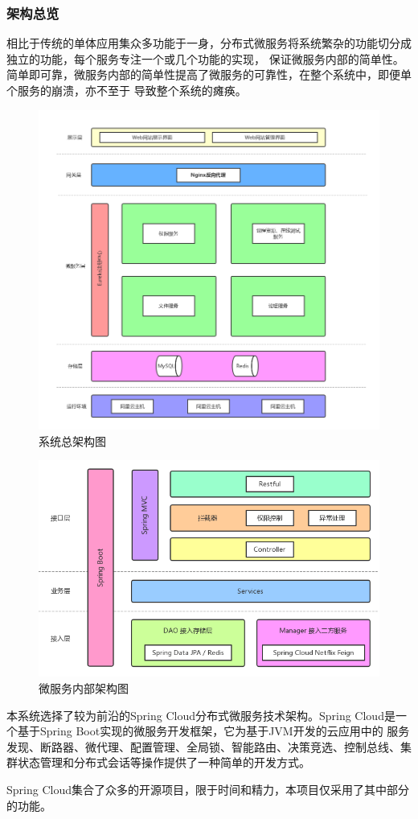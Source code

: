 \documentclass[titlepage,UTF8,linespread=1.5]{ctexart}
\begin{document}
\subsubsection{架构总览}
相比于传统的单体应用集众多功能于一身，分布式微服务将系统繁杂的功能切分成独立的功能，每个服务专注一个或几个功能的实现，
保证微服务内部的简单性。简单即可靠，微服务内部的简单性提高了微服务的可靠性，在整个系统中，即便单个服务的崩溃，亦不至于
导致整个系统的瘫痪。\par
\begin{figure}[H]
    \centering
    \includegraphics[width=150mm]{arch-overall.png}
    \caption{系统总架构图}
    \label{fig:arch-overall}
\end{figure}
\begin{figure}[H]
    \centering
    \includegraphics[width=150mm]{arch-microserver.png}
    \caption{微服务内部架构图}
    \label{fig:arch-microserver}
\end{figure}
本系统选择了较为前沿的Spring Cloud分布式微服务技术架构。Spring Cloud是一个基于Spring Boot\cite{spring-boot}实现的微服务开发框架，它为基于JVM开发的云应用中的
服务发现、断路器、微代理、配置管理、全局锁、智能路由、决策竞选、控制总线、集群状态管理和分布式会话等操作提供了一种简单的开发方式。\par
Spring Cloud集合了众多的开源项目，限于时间和精力，本项目仅采用了其中部分的功能。\par
\end{document}
